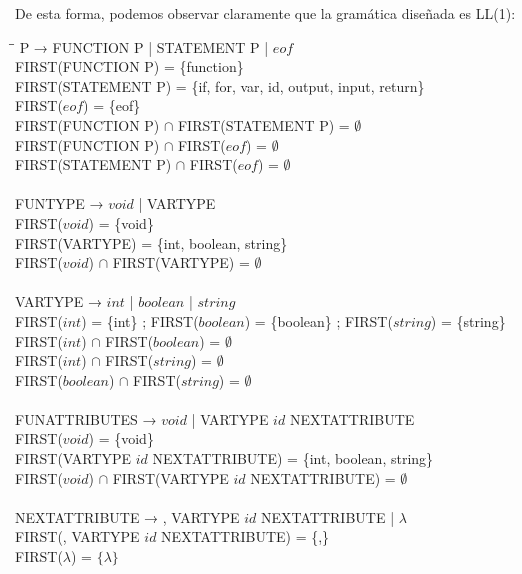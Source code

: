 De esta forma, podemos observar claramente que la gramática diseñada es LL(1):
\begin{tabbing}
    \hspace{1cm}\=\hspace{2cm}\=\kill
    P → FUNCTION P | STATEMENT P | $eof$\\
    \> FIRST(FUNCTION P) = \{function\}\\
    \> FIRST(STATEMENT P) = \{if, for, var, id, output, input, return\}\\
    \> FIRST($eof$) = \{eof\}\\
    \> \> FIRST(FUNCTION P) $\cap$ FIRST(STATEMENT P) = $\emptyset$\\
    \> \> FIRST(FUNCTION P) $\cap$ FIRST($eof$) = $\emptyset$\\
    \> \> FIRST(STATEMENT P) $\cap$ FIRST($eof$) = $\emptyset$\\
    \\
    FUNTYPE → $void$ | VARTYPE\\
    \> FIRST($void$) = \{void\}\\
    \> FIRST(VARTYPE) = \{int, boolean, string\}\\
    \> \> FIRST($void$) $\cap$ FIRST(VARTYPE) = $\emptyset$\\
    \\
    VARTYPE → $int$ | $boolean$ | $string$\\
    \> FIRST($int$) = \{int\} ; FIRST($boolean$) = \{boolean\} ; FIRST($string$) = \{string\}\\
    \> \> FIRST($int$) $\cap$ FIRST($boolean$) = $\emptyset$\\
    \> \> FIRST($int$) $\cap$ FIRST($string$) = $\emptyset$\\
    \> \> FIRST($boolean$) $\cap$ FIRST($string$) = $\emptyset$\\
    \\
    FUNATTRIBUTES → $void$ | VARTYPE $id$ NEXTATTRIBUTE\\
    \> FIRST($void$) = \{void\}\\
    \> FIRST(VARTYPE $id$ NEXTATTRIBUTE) = \{int, boolean, string\}\\
    \> \> FIRST($void$) $\cap$ FIRST(VARTYPE $id$ NEXTATTRIBUTE) = $\emptyset$\\
    \\
    NEXTATTRIBUTE → , VARTYPE $id$ NEXTATTRIBUTE | $\lambda$\\
    \> FIRST(, VARTYPE $id$ NEXTATTRIBUTE) = \{,\}\\
    \> FIRST($\lambda$) = $\{\lambda\}$\\

\end{tabbing}
